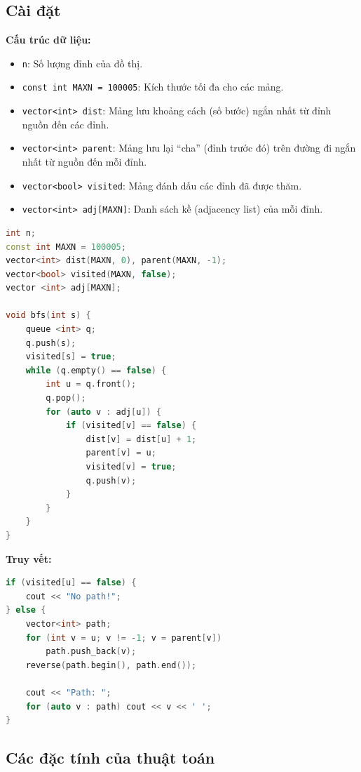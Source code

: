\subsection{Cài đặt}

\textbf{Cấu trúc dữ liệu:}
\begin{itemize}
    \item \texttt{n}: Số lượng đỉnh của đồ thị.
    \item \texttt{const int MAXN = 100005}: Kích thước tối đa cho các mảng.
    \item \texttt{vector<int> dist}: Mảng lưu khoảng cách (số bước) ngắn nhất từ đỉnh nguồn đến các đỉnh.
    \item \texttt{vector<int> parent}: Mảng lưu lại ``cha'' (đỉnh trước đó) trên đường đi ngắn nhất từ nguồn đến mỗi đỉnh.
    \item \texttt{vector<bool> visited}: Mảng đánh dấu các đỉnh đã được thăm.
    \item \texttt{vector<int> adj[MAXN]}: Danh sách kề (adjacency list) của mỗi đỉnh.
\end{itemize}

\begin{lstlisting}[language=C++, caption={Cài đặt}]
int n; 
const int MAXN = 100005;
vector<int> dist(MAXN, 0), parent(MAXN, -1);
vector<bool> visited(MAXN, false);
vector <int> adj[MAXN];

void bfs(int s) { 
    queue <int> q;
    q.push(s);
    visited[s] = true;
    while (q.empty() == false) {
        int u = q.front();
        q.pop();
        for (auto v : adj[u]) {
            if (visited[v] == false) {
                dist[v] = dist[u] + 1;
                parent[v] = u;
                visited[v] = true;
                q.push(v);
            }
        }
    }
}
\end{lstlisting}

\textbf{Truy vết:}
\begin{lstlisting}[language=C++, caption={Cài đặt truy vết đường đi từ đỉnh nguồn $s$ đến đỉnh $u$}]
if (visited[u] == false) {
    cout << "No path!";
} else {
    vector<int> path;
    for (int v = u; v != -1; v = parent[v])
        path.push_back(v);
    reverse(path.begin(), path.end());

    cout << "Path: ";
    for (auto v : path) cout << v << ' ';
}
\end{lstlisting}

\subsection{Các đặc tính của thuật toán}

